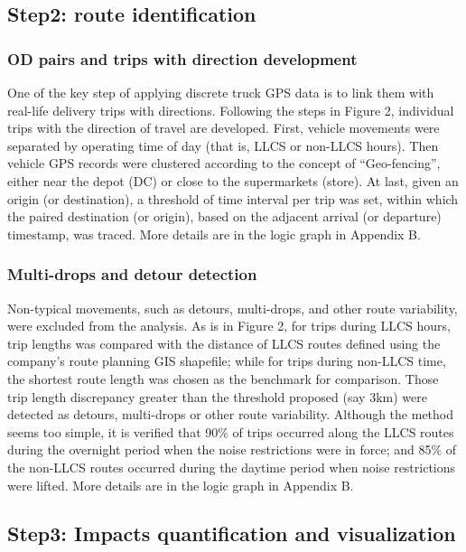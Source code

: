 \documentclass[preprint,12pt,3p]{elsarticle}
\begin{document}
\subsection{Step2: route identification}
\label{blockchain}
\subsubsection{OD pairs and trips with direction development}
\label{insurance}

One of the key step of applying discrete truck GPS data is to link them with real-life delivery trips with directions. Following the steps in Figure 2, individual trips with the direction of travel are developed. First, vehicle movements were separated by operating time of day (that is, LLCS or non-LLCS hours). Then vehicle GPS records were clustered according to the concept of “Geo-fencing”, either near the depot (DC) or close to the supermarkets (store). At last, given an origin (or destination), a threshold of time interval per trip was set, within which the paired destination (or origin), based on the adjacent arrival (or departure) timestamp, was traced. More details are in the logic graph in Appendix B.

\subsubsection{Multi-drops and detour detection}
\label{insurance}
Non-typical movements, such as detours, multi-drops, and other route variability, were excluded from the analysis.  As is in Figure 2, for trips during LLCS hours, trip lengths was compared with the distance of LLCS routes defined using the company’s route planning GIS shapefile; while for trips during non-LLCS time, the shortest route length was chosen as the benchmark for comparison. Those trip length discrepancy greater than the threshold proposed (say 3km) were detected as detours, multi-drops or other route variability. Although the method seems too simple, it is verified that 90$\%$ of trips occurred along the LLCS routes during the overnight period when the noise restrictions were in force; and 85$\%$ of the non-LLCS routes occurred during the daytime period when noise restrictions were lifted. More details are in the logic graph in Appendix B. 

\subsection{Step3: Impacts quantification and visualization}
\label{blockchain}
\end{document}
